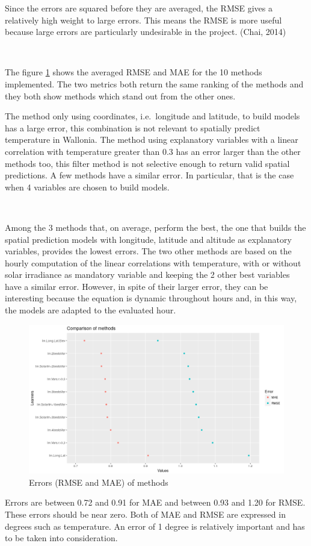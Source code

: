 \documentclass[12pt,twoside]{reedthesis}
\theoremstyle{definition}
\theoremstyle{definition}
\theoremstyle{definition}
\theoremstyle{remark}
\begin{document}
Since the errors are squared before they are averaged, the RMSE gives a
relatively high weight to large errors. This means the RMSE is more
useful because large errors are particularly undesirable in the project.
(Chai, 2014)

~

The figure \ref{fig:meanerror} shows the averaged RMSE and MAE for the
10 methods implemented. The two metrics both return the same ranking of
the methods and they both show methods which stand out from the other
ones.

The method only using coordinates, i.e.~longitude and latitude, to build
models has a large error, this combination is not relevant to spatially
predict temperature in Wallonia. The method using explanatory variables
with a linear correlation with temperature greater than 0.3 has an error
larger than the other methods too, this filter method is not selective
enough to return valid spatial predictions. A few methods have a similar
error. In particular, that is the case when 4 variables are chosen to
build models.

~

Among the 3 methods that, on average, perform the best, the one that
builds the spatial prediction models with longitude, latitude and
altitude as explanatory variables, provides the lowest errors. The two
other methods are based on the hourly computation of the linear
correlations with temperature, with or without solar irradiance as
mandatory variable and keeping the 2 other best variables have a similar
error. However, in spite of their larger error, they can be interesting
because the equation is dynamic throughout hours and, in this way, the
models are adapted to the evaluated hour.
\begin{figure}

{\centering \includegraphics[width=1\linewidth]{figure/meanerror} 

}

\caption{Errors (RMSE and MAE) of methods}\label{fig:meanerror}
\end{figure}
Errors are between 0.72 and 0.91 for MAE and between 0.93 and 1.20 for
RMSE. These errors should be near zero. Both of MAE and RMSE are
expressed in degrees such as temperature. An error of 1 degree is
relatively important and has to be taken into consideration.
\end{document}
